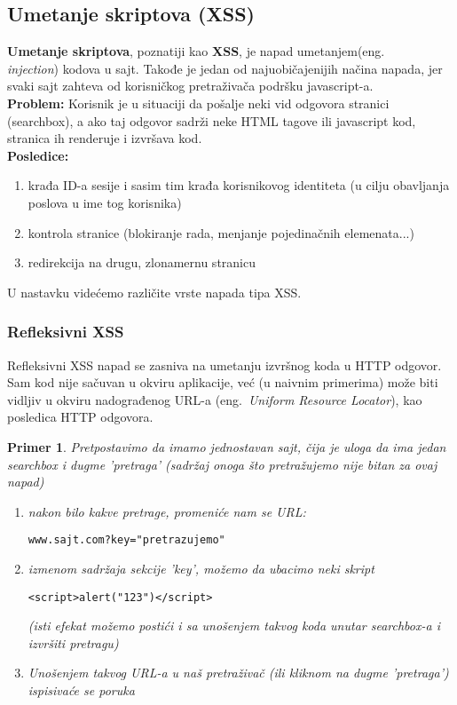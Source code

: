 \documentclass[a4paper]{article}
\newtheorem{primer}{Primer}[section]
\begin{document}
\subsection{Umetanje skriptova (XSS)}
\textbf{Umetanje skriptova}, poznatiji kao \textbf{XSS}\cite{XSS}, je napad umetanjem(eng.~{\em \\injection}) kodova u sajt. Takođe je jedan od najuobičajenijih načina napada, jer svaki sajt zahteva od korisničkog pretraživača podršku javascript-a.\\
\textbf{Problem:} Korisnik je u situaciji da pošalje neki vid odgovora stranici (searchbox), a ako taj odgovor sadrži neke HTML tagove ili javascript kod, stranica ih renderuje i izvršava kod.\\
\textbf{Posledice:}
\begin{enumerate}
	\item krađa ID-a sesije i sasim tim krađa korisnikovog identiteta (u cilju obavljanja poslova u ime tog korisnika)
	\item kontrola stranice (blokiranje rada, menjanje pojedinačnih elemenata...)
	\item redirekcija na drugu, zlonamernu stranicu
\end{enumerate}
U nastavku videćemo različite vrste napada tipa XSS.

\subsubsection{Refleksivni XSS}

Refleksivni XSS napad se zasniva na umetanju izvršnog koda u HTTP odgovor. Sam kod nije sačuvan u okviru aplikacije, već (u naivnim primerima) može biti vidljiv u okviru nadograđenog URL-a (eng.~{\em Uniform Resource Locator}), kao posledica HTTP odgovora.
\begin{primer}
\label{primer1}
Pretpostavimo da imamo jednostavan sajt, čija je uloga da ima jedan searchbox i dugme 'pretraga' (sadržaj onoga što pretražujemo nije bitan za ovaj napad)
\begin{enumerate}
\item nakon bilo kakve pretrage, promeniće nam se URL: 
\begin{lstlisting}
www.sajt.com?key="pretrazujemo"
\end{lstlisting}
\item izmenom sadržaja sekcije 'key', možemo da ubacimo neki skript

\begin{lstlisting}
<script>alert("123")</script>
\end{lstlisting}

(isti efekat možemo postići i sa unošenjem takvog koda unutar searchbox-a i izvršiti pretragu)
\item Unošenjem takvog URL-a u naš pretraživač (ili kliknom na dugme 'pretraga') ispisivaće se poruka \\

\end{enumerate}
\end{primer}
\end{document}

